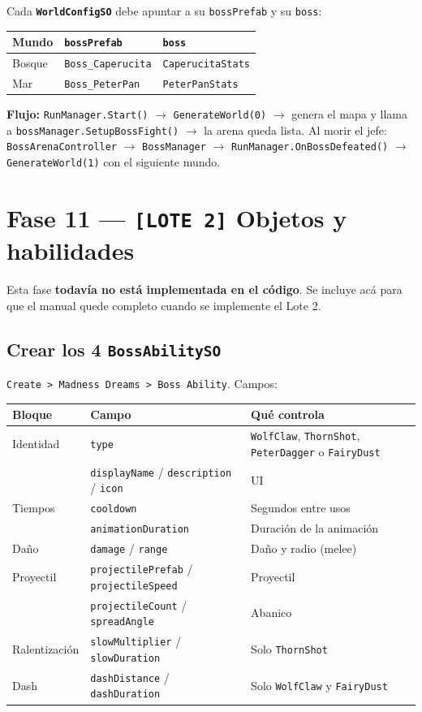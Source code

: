 \documentclass[a4paper,12pt]{article}
\newcommand{\code}[1]{\texttt{#1}}
\begin{document}
Cada \textbf{\code{WorldConfigSO}} debe apuntar a su \code{bossPrefab} y su \code{boss}:

\begin{center}
\begin{tabular}{|l|l|l|}
\hline
\textbf{Mundo} & \textbf{\code{bossPrefab}} & \textbf{\code{boss}} \\
\hline
Bosque & \code{Boss\_Caperucita} & \code{CaperucitaStats} \\
\hline
Mar & \code{Boss\_PeterPan} & \code{PeterPanStats} \\
\hline
\end{tabular}
\end{center}

\textbf{Flujo:} \code{RunManager.Start()} $\to$ \code{GenerateWorld(0)} $\to$ genera el mapa y
llama a \code{bossManager.SetupBossFight()} $\to$ la arena queda lista. Al morir el jefe:
\code{BossArenaController} $\to$ \code{BossManager} $\to$ \code{RunManager.OnBossDefeated()} $\to$
\code{GenerateWorld(1)} con el siguiente mundo.

\section{Fase 11 --- \code{[LOTE 2]} Objetos y habilidades}

Esta fase \textbf{todavía no está implementada en el código}. Se incluye acá para que el manual
quede completo cuando se implemente el Lote 2.

\subsection{Crear los 4 \code{BossAbilitySO}}

\code{Create > Madness Dreams > Boss Ability}. Campos:

\begin{center}
\begin{longtable}{|l|l|p{6.2cm}|}
\hline
\textbf{Bloque} & \textbf{Campo} & \textbf{Qué controla} \\
\hline
\endhead
Identidad & \code{type} & \code{WolfClaw}, \code{ThornShot}, \code{PeterDagger} o \code{FairyDust} \\
\hline
 & \code{displayName} / \code{description} / \code{icon} & UI \\
\hline
Tiempos & \code{cooldown} & Segundos entre usos \\
\hline
 & \code{animationDuration} & Duración de la animación \\
\hline
Daño & \code{damage} / \code{range} & Daño y radio (melee) \\
\hline
Proyectil & \code{projectilePrefab} / \code{projectileSpeed} & Proyectil \\
\hline
 & \code{projectileCount} / \code{spreadAngle} & Abanico \\
\hline
Ralentización & \code{slowMultiplier} / \code{slowDuration} & Solo \code{ThornShot} \\
\hline
Dash & \code{dashDistance} / \code{dashDuration} & Solo \code{WolfClaw} y \code{FairyDust} \\
\hline
\end{longtable}
\end{center}
\end{document}
